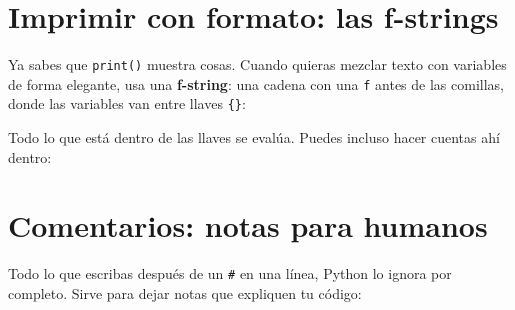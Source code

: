 \documentclass[
  spanish,
  letterpaper,
  DIV=11,
  numbers=noendperiod]{scrreprt}
\newenvironment{Shaded}{\begin{snugshade}}{\end{snugshade}}
\newcommand{\BuiltInTok}[1]{\textcolor[rgb]{0.00,0.23,0.31}{#1}}
\newcommand{\CommentTok}[1]{\textcolor[rgb]{0.37,0.37,0.37}{#1}}
\newcommand{\DecValTok}[1]{\textcolor[rgb]{0.68,0.00,0.00}{#1}}
\newcommand{\FloatTok}[1]{\textcolor[rgb]{0.68,0.00,0.00}{#1}}
\newcommand{\NormalTok}[1]{\textcolor[rgb]{0.00,0.23,0.31}{#1}}
\newcommand{\OperatorTok}[1]{\textcolor[rgb]{0.37,0.37,0.37}{#1}}
\newcommand{\SpecialCharTok}[1]{\textcolor[rgb]{0.37,0.37,0.37}{#1}}
\newcommand{\SpecialStringTok}[1]{\textcolor[rgb]{0.13,0.47,0.30}{#1}}
\begin{document}
\section{Imprimir con formato: las
f-strings}\label{imprimir-con-formato-las-f-strings}

Ya sabes que \texttt{print()} muestra cosas. Cuando quieras mezclar
texto con variables de forma elegante, usa una \textbf{f-string}: una
cadena con una \texttt{f} antes de las comillas, donde las variables van
entre llaves \texttt{\{\}}:

\begin{Shaded}
\end{Shaded}

Todo lo que está dentro de las llaves se evalúa. Puedes incluso hacer
cuentas ahí dentro:

\begin{Shaded}
\end{Shaded}

\section{Comentarios: notas para
humanos}\label{comentarios-notas-para-humanos}

Todo lo que escribas después de un \texttt{\#} en una línea, Python lo
ignora por completo. Sirve para dejar notas que expliquen tu código:

\begin{Shaded}
\end{Shaded}
\end{document}
